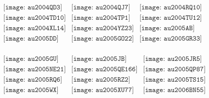 \documentclass{article}
\begin{document}
\begin{figure}[H]
 \begin{center}$
 \begin{array}{cccc}
\texttt{[image: au2004QD3]}&\texttt{[image: au2004QJ7]}&\texttt{[image: au2004RQ10]}\\\texttt{[image: au2004TD10]}&\texttt{[image: au2004TP1]}&\texttt{[image: au2004TU12]}\\\texttt{[image: au2004XL14]}&\texttt{[image: au2004YZ23]}&\texttt{[image: au2005AB]}\\\texttt{[image: au2005DD]}&\texttt{[image: au2005GO22]}&\texttt{[image: au2005GR33]}\\
\end{array}$
\end{center}
\end{figure}

\begin{figure}[H]
 \begin{center}$
 \begin{array}{cccc}
\texttt{[image: au2005GU]}&\texttt{[image: au2005JB]}&\texttt{[image: au2005JR5]}\\\texttt{[image: au2005NE21]}&\texttt{[image: au2005QE166]}&\texttt{[image: au2005QP87]}\\\texttt{[image: au2005RQ6]}&\texttt{[image: au2005RZ2]}&\texttt{[image: au2005TS15]}\\\texttt{[image: au2005WX]}&\texttt{[image: au2005XU77]}&\texttt{[image: au2006BN55]}\\
\end{array}$
\end{center}
\end{figure}
\end{document}
